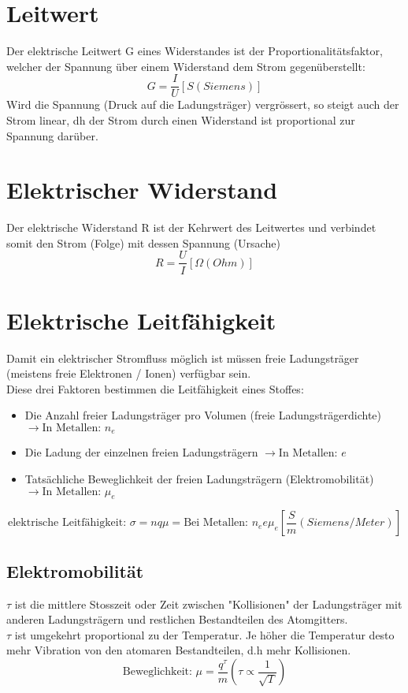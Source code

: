\documentclass{article}
\begin{document}
	\section{Leitwert}
	Der elektrische Leitwert G eines Widerstandes ist der Proportionalitätsfaktor, welcher der Spannung über einem Widerstand dem Strom gegenüberstellt:
	\begin{equation}
		G = \frac{I}{U} \left[S \left(Siemens\right) \right] 
	\end{equation}
	Wird die Spannung (Druck auf die Ladungsträger) vergrössert, so steigt auch der Strom linear, dh der Strom durch einen Widerstand ist proportional zur Spannung darüber. 
	\section{Elektrischer Widerstand}
	Der elektrische Widerstand R ist der Kehrwert des Leitwertes und verbindet somit den Strom (Folge) mit dessen Spannung (Ursache)
	\begin{equation}
	R = \frac{U}{I} \left[\Omega \left(Ohm\right) \right] 
	\end{equation}
	\section{Elektrische Leitfähigkeit}
	Damit ein elektrischer Stromfluss möglich ist müssen freie Ladungsträger (meistens freie Elektronen / Ionen) verfügbar sein. \\
	Diese drei Faktoren bestimmen die Leitfähigkeit eines Stoffes:
	\begin{itemize}
		\item Die Anzahl freier Ladungsträger pro Volumen (freie Ladungsträgerdichte) 	$\rightarrow \textrm{In Metallen: } n_e$
		\item Die Ladung der einzelnen freien Ladungsträgern            				$\rightarrow \textrm{In Metallen: } e$
		\item Tatsächliche Beweglichkeit der freien Ladungsträgern (Elektromobilität)	$\rightarrow \textrm{In Metallen: } \mu_e$
	\end{itemize}
	\begin{equation}
		\textrm{elektrische Leitfähigkeit: } \sigma = n q \mu = \textrm{Bei Metallen: }n_e e \mu_e  \left[\frac{S}{m} \left(Siemens/Meter\right) \right]
	\end{equation}
	\subsection{Elektromobilität}
	$\tau$ ist die mittlere Stosszeit oder Zeit zwischen "Kollisionen" der Ladungsträger mit anderen Ladungsträgern und restlichen Bestandteilen des Atomgitters. \\
	$\tau$ ist umgekehrt proportional zu der Temperatur. Je höher die Temperatur desto mehr Vibration von den atomaren Bestandteilen, d.h mehr Kollisionen.
	\begin{equation}
		\textrm{Beweglichkeit: } \mu = \frac{q^\tau}{m} \left( \tau \propto \frac{1}{\sqrt{T}}\right) 
	\end{equation}
\end{document}
